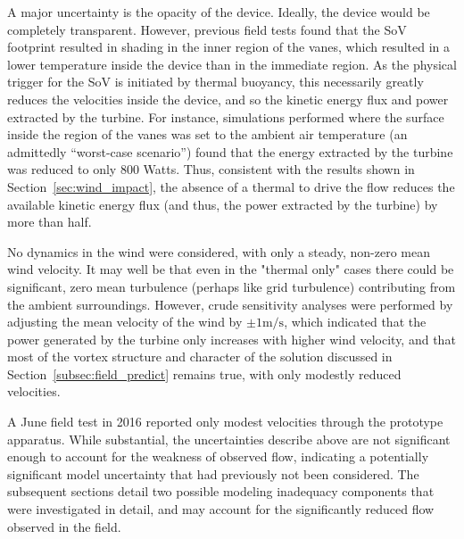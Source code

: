 A major uncertainty is the opacity of the device. Ideally, the device
would be completely transparent. However, previous field tests
found that the SoV footprint resulted in shading in the inner region of
the vanes, which resulted in a lower temperature inside the device than
in the immediate region. As the physical trigger for the SoV is
initiated by thermal buoyancy, this necessarily greatly reduces the
velocities inside the device, and so the kinetic energy flux and power
extracted by the turbine. For instance, simulations performed where the
surface inside the region of the vanes was set to the ambient air
temperature (an admittedly ``worst-case scenario'') found that the
energy extracted by the turbine was reduced to only 800 Watts. Thus,
consistent with the results shown in Section~\ref{sec:wind_impact}, the
absence of a thermal to drive the flow reduces the available kinetic
energy flux (and thus, the power extracted by the turbine) by more than
half. 





No dynamics in the wind were considered, with only a steady,
non-zero mean wind velocity. It may well be that even in the "thermal
only" cases there could be significant, zero mean turbulence (perhaps
like grid turbulence) contributing from the ambient
surroundings. However, crude sensitivity analyses were performed by
adjusting the mean velocity of the wind by  $\pm 1 \text{m}/\text{s}$,
which indicated that the power generated by the turbine only increases
with higher wind velocity, and that most of the vortex structure and
character of the solution discussed in
Section~\ref{subsec:field_predict} remains true, with only modestly
reduced velocities. 


A June field test in 2016 reported only modest velocities through the
prototype apparatus.
While substantial, the uncertainties describe above are not significant
enough to account for the weakness of observed flow, indicating a
potentially significant model uncertainty that had previously not been
considered. The subsequent sections detail two possible modeling
inadequacy components that were investigated in detail, and may account
for the significantly reduced flow observed in the field. 

